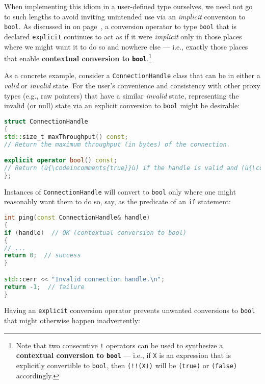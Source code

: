 When implementing this idiom in a user-defined type ourselves, we need not go to such lengths to avoid inviting unintended use
via an \emph{implicit} conversion to \texttt{bool}. As discussed in \textit{} on page~\pageref{description-explicitconv}, a conversion operator to type
\texttt{bool} that is declared \texttt{explicit} continues to act as if
it were \emph{implicit} only in those places where we might want it to
do so and nowhere else --- i.e., exactly those places that enable
\textbf{contextual conversion to \texttt{bool}}.{\cprotect\footnote{Note that two
consecutive \texttt{!} operators can be used to synthesize a
\textbf{contextual conversion to \texttt{bool}} --- i.e., if \texttt{X} is an
expression that is explicitly convertible to \texttt{bool}, then
\texttt{(!!(X))} will be \texttt{(true)} or \texttt{(false)}
accordingly.}}

As a concrete example, consider a \texttt{ConnectionHandle} class that
can be in either a \emph{valid} or \emph{invalid} state. For the user's
convenience and consistency with other proxy types (e.g., raw pointers)
that have a similar \emph{invalid} state, representing the invalid (or null) state via an explicit conversion to
\texttt{bool} might be desirable:

\begin{lstlisting}[language=C++]
struct ConnectionHandle
{
std::size_t maxThroughput() const;
// Return the maximum throughput (in bytes) of the connection.

explicit operator bool() const;
// Return (ù{\codeincomments{true}}ù) if the handle is valid and (ù{\codeincomments{false}}ù) otherwise.
};
\end{lstlisting}

\noindent Instances of \texttt{ConnectionHandle} will convert to \texttt{bool}
only where one might reasonably want them to do so, say, as the
predicate of an \texttt{if} statement:

\begin{lstlisting}[language=C++]
int ping(const ConnectionHandle& handle)
{
if (handle)  // OK (contextual conversion to bool)
{
// ...
return 0;  // success
}

std::cerr << "Invalid connection handle.\n";
return -1;  // failure
}
\end{lstlisting}

\noindent Having an \texttt{explicit} conversion operator prevents unwanted
conversions to \texttt{bool} that might otherwise happen inadvertently:

